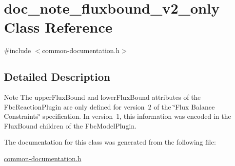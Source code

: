 \hypertarget{classdoc__note__fluxbound__v2__only}{}\section{doc\+\_\+note\+\_\+fluxbound\+\_\+v2\+\_\+only Class Reference}
\label{classdoc__note__fluxbound__v2__only}


{\ttfamily \#include $<$common-\/documentation.\+h$>$}



\subsection{Detailed Description}
\begin{DoxyNote}{Note}
The \textquotesingle{}upper\+Flux\+Bound\textquotesingle{} and \textquotesingle{}lower\+Flux\+Bound\textquotesingle{} attributes of the Fbc\+Reaction\+Plugin are only defined for version~2 of the \char`\"{}\+Flux 
   Balance Constraints\char`\"{} specification. In version~1, this information was encoded in the Flux\+Bound children of the Fbc\+Model\+Plugin. 
\end{DoxyNote}


The documentation for this class was generated from the following file\+:\begin{DoxyCompactItemize}
\item 
\hyperlink{common-documentation_8h}{common-\/documentation.\+h}\end{DoxyCompactItemize}
